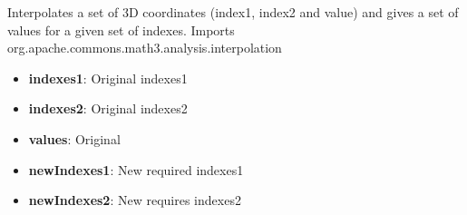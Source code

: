 \documentclass[10pt,a4paper]{report}
\newcommand{\packagebeginning}{edu.kit.informatik.pse.gelf} %
\newcommand{\lblroot}{lbl} %
\newcommand{\lblpackage}{} %
\newcommand{\lblpackageelement}{} %
\newcommand{\lblpackageelementmember}{} %
\newcommand{\lblpackageelementmemberparameter}{} %
\newcommand{\casclabelname}{\lblroot\lblpackage\lblpackageelement\lblpackageelementmember\lblpackageelementmemberparameter}
\newcommand{\casclabel}{\label{\casclabelname}}
\newcommand{\putcasclabel}[3]{
    \renewcommand{#1}{:#2}
    \casclabel
    #3
    \renewcommand{#1}{}
}
\newcommand{\paramdesc}[2]{
\putcasclabel{\lblpackageelementmemberparameter}{#1}{
    \textbf{#1}: #2
}
}
\begin{document}
{{\begin{itemize}
        {Interpolates a set of 3D coordinates (index1, index2 and value) and gives a set of values for a given set of indexes. \newline
        Imports org.apache.commons.math3.analysis.interpolation}{
        \begin{itemize}
            \item \paramdesc{indexes1}{Original indexes1}
            \item \paramdesc{indexes2}{Original indexes2}
            \item \paramdesc{values}{Original}
            \item \paramdesc{newIndexes1}{New required indexes1}
            \item \paramdesc{newIndexes2}{New requires indexes2}
        \end{itemize}
        }{}
    \end{itemize}
}{}

}
\end{document}
